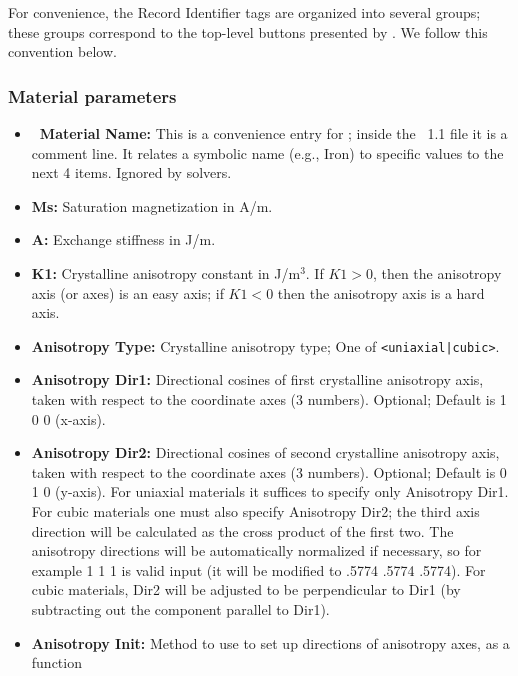 For convenience, the Record Identifier tags are organized into several
groups; these groups correspond to the top-level buttons presented by
.  We follow this convention below.

\subsubsection{Material parameters}
\begin{itemize}
\item {\bf\lb\ Material Name:} This is a convenience entry for
   ; inside the \MIF~1.1 file it is a comment line.  It
   relates a symbolic name (e.g., Iron) to specific values to the next
   4 items.  Ignored by solvers.
\item {\bf Ms:} Saturation magnetization
   in A/m.
\item {\bf A:} Exchange stiffness in J/m.
\item {\bf K1:} Crystalline
 anisotropy
   constant in J/m${}^3$.  If $K1>0$, then the anisotropy axis (or axes)
   is an easy axis; if $K1<0$ then the anisotropy axis is a hard axis.
\item {\bf Anisotropy Type:} Crystalline anisotropy type; One of
\texttt{<uniaxial|cubic>}.
\item {\bf Anisotropy Dir1:} Directional cosines of first crystalline
   anisotropy axis, taken with respect to the coordinate axes (3
   numbers).  Optional; Default is 1 0 0 (x-axis).
\item {\bf Anisotropy Dir2:} Directional cosines of second crystalline
   anisotropy axis, taken with respect to the coordinate axes (3
   numbers).  Optional; Default is 0 1 0 (y-axis).
   \html{\\}\latex{\par}
   For uniaxial materials it suffices to specify only Anisotropy
   Dir1.  For cubic materials one must also specify Anisotropy
   Dir2; the third axis direction will be calculated as the cross
   product of the first two.  The anisotropy directions will be
   automatically normalized if necessary, so for example 1 1 1 is
   valid input (it will be modified to .5774 .5774 .5774).  For cubic
   materials, Dir2 will be adjusted to be perpendicular to Dir1 (by
   subtracting out the component parallel to Dir1).
\item {\bf Anisotropy Init:}
   Method to use to set up directions of anisotropy axes, as a function

\end{itemize}

